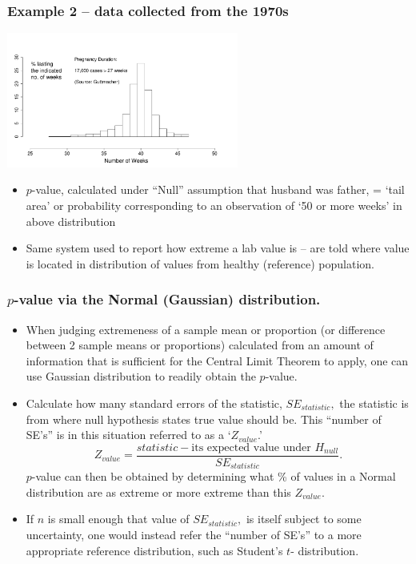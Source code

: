 \documentclass{beamer}\usepackage[]{graphicx}\usepackage[]{color}
\begin{document}
\begin{frame}
\frametitle{Example 2 -- data collected from the 1970s}

	\begin{center}
		\includegraphics[width=3in]{PregnancyDuration.pdf}
	\end{center}
	
	\begin{itemize}
		\setlength\itemsep{.3em}
		\item $p$-value, calculated under ``Null'' assumption 
	that husband was father,  =  `tail area' or probability corresponding  to an observation
	of `50 or more weeks' in  above distribution 
	
	\item Same system used to report how extreme a lab value is -- are told
	where value is located in distribution of values from  healthy (reference) population.
	\end{itemize} 
	

\end{frame}



\begin{frame}
\frametitle{$p$-value via the Normal (Gaussian) distribution.}

\begin{footnotesize}
\begin{itemize}
\item When judging extremeness of a sample mean or proportion (or  difference between 2 sample means or proportions) calculated from an amount of information that is sufficient for the Central Limit Theorem to apply, one can use Gaussian distribution to readily obtain the $p$-value.
\item Calculate how many standard errors of the statistic, $SE_{statistic},$ the statistic is from where null hypothesis states true value should be.  This ``number of SE's'' is in this situation referred to as a `$Z_{value}$.'
$$Z_{value} = \frac{statistic -  \textrm{its expected value under } H_{null} }{SE_{statistic}}.$$
$p$-value can then be obtained by determining what \% of values in a Normal distribution are as extreme or more extreme than this $Z_{value}.$
\item
If $n$ is small enough that value of $SE_{statistic},$ is itself subject to some 
uncertainty, one would instead refer the ``number of SE's'' to a more appropriate reference distribution, such as Student's $t$- distribution.
\end{itemize}

\end{footnotesize}
\end{frame}
\end{document}
